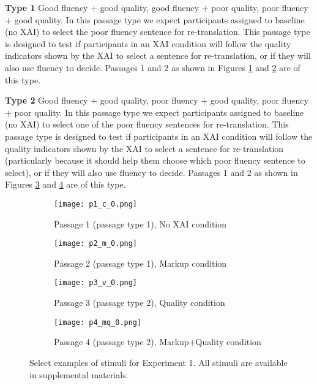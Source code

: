 \begin{compacthang}
    \item \textbf{Type 1} Good fluency + good quality, good fluency + poor quality, poor fluency + good quality. In this passage type we expect participants assigned to baseline (no XAI) to select the poor fluency sentence for re-translation. This passage type is designed to test if participants in an XAI condition will follow the quality indicators shown by the XAI to select a sentence for re-translation, or if they will also use fluency to decide. Passages 1 and 2 as shown in Figures \ref{fig:p1_no_xai} and \ref{fig:p2_markup} are of this type.    

    \item \textbf{Type 2} Good fluency + good quality, poor fluency + good quality, poor fluency + poor quality. In this passage type we expect participants assigned to baseline (no XAI) to select one of the poor fluency sentences for re-translation. This passage type is designed to test if participants in an XAI condition will follow the quality indicators shown by the XAI to select a sentence for re-translation (particularly because it should help them choose which poor fluency sentence to select), or if they will also use fluency to decide. Passages 1 and 2 as shown in Figures \ref{fig:p3_quality} and \ref{fig:p4_markup_quality} are of this type.     
\end{compacthang}

\begin{figure}
    \centering
    \begin{subfigure}[t]{0.45\textwidth}
        \centering
        \texttt{[image: p1\_c\_0.png]} 
        \caption{Passage 1 (passage type 1), No XAI condition} \label{fig:p1_no_xai}
    \end{subfigure}
    \hfill
    \begin{subfigure}[t]{0.45\textwidth}
        \centering
        \texttt{[image: p2\_m\_0.png]} 
        \caption{Passage 2 (passage type 1), Markup condition} \label{fig:p2_markup}
    \end{subfigure}
    
    \vspace{5px}
    
     \begin{subfigure}[t]{0.45\textwidth}
        \centering
        \texttt{[image: p3\_v\_0.png]} 
        \caption{Passage 3 (passage type 2), Quality condition} \label{fig:p3_quality}
    \end{subfigure}
    \hfill
    \begin{subfigure}[t]{0.45\textwidth}
        \centering
        \texttt{[image: p4\_mq\_0.png]} 
        \caption{Passage 4 (passage type 2), Markup+Quality condition} \label{fig:p4_markup_quality}
    \end{subfigure}
    
    \caption{Select examples of stimuli for Experiment 1. All stimuli are available in supplemental materials.}
    \label{fig:exp1_stim}
    
\end{figure}

